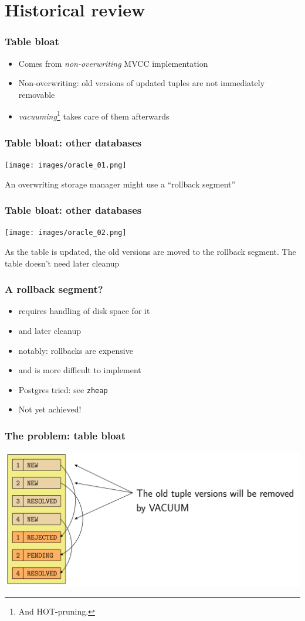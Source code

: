 \section{Historical review}

\begin{frame}
  \frametitle{Table bloat}
  \begin{itemize}
    \item Comes from \emph{non-overwriting} MVCC implementation
    \item Non-overwriting: old versions of updated tuples are not immediately removable
    \item \emph{vacuuming}\footnote{And HOT-pruning.} takes care of them afterwards
  \end{itemize}
\end{frame}

\begin{frame}
  \frametitle{Table bloat: other databases}
  \texttt{[image: images/oracle\_01.png]}

  An overwriting storage manager might use a ``rollback segment''
\end{frame}

\begin{frame}
  \frametitle{Table bloat: other databases}
  \texttt{[image: images/oracle\_02.png]}

  As the table is updated, the old versions are moved to the rollback segment. The table doesn't need later cleanup
\end{frame}

\begin{frame}
  \frametitle{A rollback segment?}
  \begin{itemize}
    \item requires handling of disk space for it
    \item and later cleanup
    \item notably: rollbacks are expensive
    \item<2> and is more difficult to implement
    \item<2> Postgres tried: see \texttt{zheap}
    \item<2> Not yet achieved!
  \end{itemize}
\end{frame}

\begin{frame}
  \frametitle{The problem: table bloat}
  \includegraphics[height=\sizeforimages\textheight]{images/bloat_01.png}
\end{frame}

